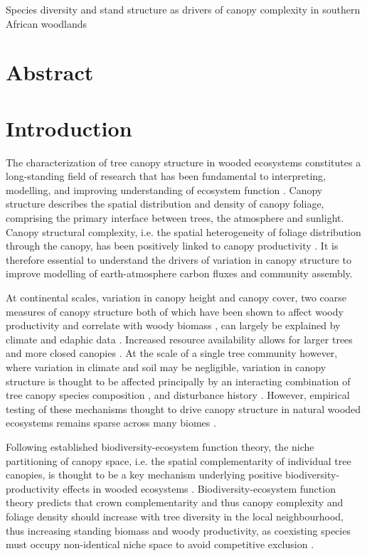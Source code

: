 \documentclass[11pt,a4paper]{article}
\newcommand{\titletext}{Species diversity and stand structure as drivers of canopy complexity in southern African woodlands}
\begin{document}
{\LARGE{\titletext{}}}

\linenumbers

\section*{Abstract}

\section{Introduction}

The characterization of tree canopy structure in wooded ecosystems constitutes a long-standing field of research that has been fundamental to interpreting, modelling, and improving understanding of ecosystem function \citep{Watt1947, Whittaker1969, Horn1971, Maarel1996}. Canopy structure describes the spatial distribution and density of canopy foliage, comprising the primary interface between trees, the atmosphere and sunlight. Canopy structural complexity, i.e. the spatial heterogeneity of foliage distribution through the canopy, has been positively linked to canopy productivity \citep{Hardiman2011,Chen2012,Law2001,Baldochii2001,Morin2015}. It is therefore essential to understand the drivers of variation in canopy structure to improve modelling of earth-atmosphere carbon fluxes and community assembly. 

At continental scales, variation in canopy height and canopy cover, two coarse measures of canopy structure both of which have been shown to affect woody productivity and correlate with woody biomass \citep{}, can largely be explained by climate and edaphic data \citep{SOME-GEDI}. Increased resource availability allows for larger trees and more closed canopies \citep{}. At the scale of a single tree community however, where variation in climate and soil may be negligible, variation in canopy structure is thought to be affected principally by an interacting combination of tree canopy species composition \citep{}, and disturbance history \citep{}. However, empirical testing of these mechanisms thought to drive canopy structure in natural wooded ecosystems remains sparse across many biomes \citep{}.

Following established biodiversity-ecosystem function theory, the niche partitioning of canopy space, i.e. the spatial complementarity of individual tree canopies, is thought to be a key mechanism underlying positive biodiversity-productivity effects in wooded ecosystems \citep{Pretzsch2014, Barry2019}. Biodiversity-ecosystem function theory predicts that crown complementarity and thus canopy complexity and foliage density should increase with tree diversity in the local neighbourhood, thus increasing standing biomass and woody productivity, as coexisting species must occupy non-identical niche space to avoid competitive exclusion \citep{Gadow1993}. 
\end{document}
